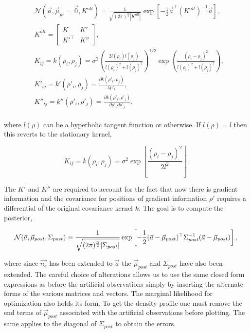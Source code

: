 \begin{equation}
\begin{aligned}
&\mathcal{N}(\vec{a}, \vec \mu_{pr} = \vec{0}, K^{alt}) = \frac{1}{\sqrt{(2\pi)^{\frac{n}{2}}|K^{alt}|}} \exp \left[{{-\frac{1}{2}\vec{a}^\top (K^{alt})^{-1}\vec{a}}}\right],\\
&K^{alt} = \begin{bmatrix} K & K'\\ K'^\top & K''\end{bmatrix},\\
&K_{ij} = k(\rho_i, \rho_j) = \sigma^2 \left( \frac{2l(\rho_i)l(\rho_j)}{l(\rho_i)^2 + l(\rho_j)^2} \right)^{1/2} \exp\left({\frac{(\rho_i - \rho_j)^2}{l(\rho_i)^2+l(\rho_j)^2}}\right),\\
&K'_{ij} = k'(\rho'_i, \rho_j) = \frac{\partial k{(\rho'_i,\rho_j)}}{\partial \rho'_i},\\
&K''_{ij} = k''(\rho'_i, \rho'_j) = \frac{\partial k{(\rho'_i,\rho'_j)}}{\partial \rho'_i\partial \rho'_j},\\
\end{aligned}
\end{equation}

\noindent where $l(\rho)$ can be a hyperbolic tangent function or otherwise. If $l(\rho) = l$ then this reverts to the stationary kernel,

\begin{equation}
K_{ij} = k(\rho_i, \rho_j) = \sigma^2 \exp\left[{\frac{(\rho_i - \rho_j)^2}{2l^2}}\right].
\end{equation}

\noindent The $K'$  and $K''$ are required to account for the fact that now there is gradient information and the covariance for positions of gradient information $\rho'$ requires a differential of the original covariance kernel $k$. The goal is to compute the posterior,  

\begin{equation}
\mathcal{N}(\vec{a}, \vec{\mu}_{post}, \Sigma_{post}) = \frac{1}{\sqrt{(2\pi)^{\frac{n}{2}}|\Sigma_{post}|}} \exp \left[{{-\frac{1}{2}(\vec{a}-\vec{\mu}_{post})^\top\Sigma_{post}^{-1}(\vec{a}-\vec{\mu}_{post})}}\right],\\
\end{equation}

\noindent where since $\vec{n_e}$ has been extended to $\vec a$ the $\vec{\mu}_{post}$ and $\Sigma_{post}$ have also been extended. The careful choice of alterations allows us to use the same closed form expressions as before the artificial observations simply by inserting the alternate forms of the various matrices and vectors. The marginal likelihood for optimization also holds its form. To get the density profile one must remove the end terms of $\vec{\mu}_{post}$ associated with the artificial observations before plotting. The same applies to the diagonal of $\Sigma_{post}$ to obtain the errors. 